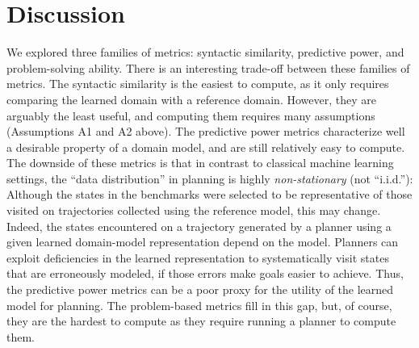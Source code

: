 \section{Discussion}
We explored three families of metrics: syntactic similarity, predictive power, and problem-solving ability. 
There is an interesting trade-off between these families of metrics. 
The syntactic similarity is the easiest to compute, as it only requires comparing the learned domain with a reference domain. However, they are arguably the least useful, and computing them requires many assumptions (Assumptions A1 and A2 above). 
The predictive power metrics characterize well a desirable property of a domain model, and are still relatively easy to compute. 
The downside of these metrics is that in contrast to classical machine learning settings, the ``data distribution'' in planning is highly \emph{non-stationary} (not ``i.i.d.''):  Although the states in the benchmarks were selected to be representative of those visited on trajectories collected using the reference model, this may change. Indeed, the states encountered on a trajectory generated by a planner using a given learned domain-model representation depend on the model. Planners can exploit deficiencies in the learned representation to systematically visit states that are erroneously modeled, if those errors make goals easier to achieve. Thus, the predictive power metrics can be a poor proxy for the utility of the learned model for planning. The problem-based metrics fill in this gap, but, of course, they are the hardest to compute as they require running a planner to compute them. 





